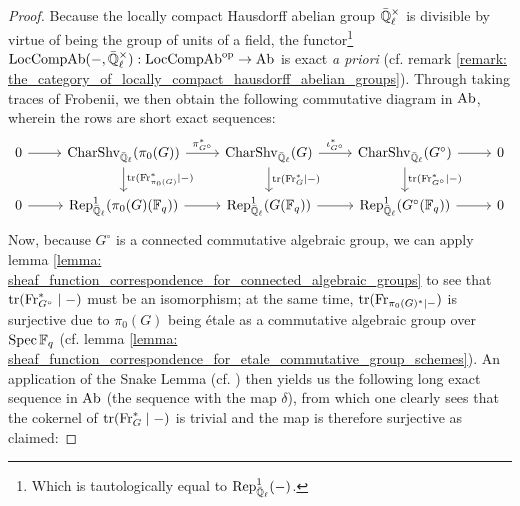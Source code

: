             \begin{proof}
                Because the locally compact Hausdorff abelian group $\bar{\Q}_{\ell}^{\x}$ is divisible by virtue of being the group of units of a field, the functor\footnote{Which is tautologically equal to $\mathrm{Rep}^1_{\bar{\mathbb{Q}}_{\ell}}(-)$.} $\Loc\Comp\Ab(-, \bar{\Q}_{\ell}^{\x}): \Loc\Comp\Ab^{\op} \to \Ab$ is exact \textit{a priori} (cf. remark \ref{remark: the_category_of_locally_compact_hausdorff_abelian_groups}). Through taking traces of Frobenii, we then obtain the following commutative diagram in $\mathrm{Ab}$, wherein the rows are short exact sequences:
                    $$
                        \begin{tikzcd}
                        	0 & {\Char\Shv_{\bar{\Q}_{\ell}}(\pi_0(G))} & {\Char\Shv_{\bar{\Q}_{\ell}}(G)} & {\Char\Shv_{\bar{\Q}_{\ell}}(G^{\circ})} & 0 \\
                        	0 & {\Rep^1_{\bar{\Q}_{\ell}}(\pi_0(G)(\F_q))} & {\Rep^1_{\bar{\Q}_{\ell}}(G(\F_q))} & {\Rep^1_{\bar{\Q}_{\ell}}(G^{\circ}(\F_q))} & 0
                        	\arrow[from=1-1, to=1-2]
                        	\arrow["{\pi_{G^{\circ}}^*}", from=1-2, to=1-3]
                        	\arrow["{\iota_{G^{\circ}}^*}", from=1-3, to=1-4]
                        	\arrow[from=1-4, to=1-5]
                        	\arrow[from=2-1, to=2-2]
                        	\arrow[from=2-2, to=2-3]
                        	\arrow[from=2-3, to=2-4]
                        	\arrow[from=2-4, to=2-5]
                        	\arrow["{\trace(\Frob_{\pi_0(G)}^* \mid -)}", from=1-2, to=2-2]
                        	\arrow["{\trace(\Frob_G^* \mid -)}", from=1-3, to=2-3]
                        	\arrow["{\trace(\Frob_{G^{\circ}}^* \mid -)}", from=1-4, to=2-4]
                        \end{tikzcd}
                    $$
                Now, because $G^{\circ}$ is a connected commutative algebraic group, we can apply lemma \ref{lemma: sheaf_function_correspondence_for_connected_algebraic_groups} to see that $\operatorname{tr}(\mathrm{Fr}_{G^{\circ}}^* \mid -)$ must be an isomorphism; at the same time, $\operatorname{tr}(\mathrm{Fr}_{\pi_0(G)^* \mid -})$ is surjective due to $\pi_0(G)$ being \'etale as a commutative algebraic group over $\operatorname{Spec} \mathbb{F}_q$ (cf. lemma \ref{lemma: sheaf_function_correspondence_for_etale_commutative_group_schemes}). An application of the Snake Lemma (cf. \cite[\href{https://stacks.math.columbia.edu/tag/07JV}{Tag 07JV}]{stacks}) then yields us the following long exact sequence in $\mathrm{Ab}$ (the sequence with the map $\delta$), from which one clearly sees that the cokernel of $\operatorname{tr}(\mathrm{Fr}_G^* \mid -)$ is trivial and the map is therefore surjective as claimed:

\end{proof}
